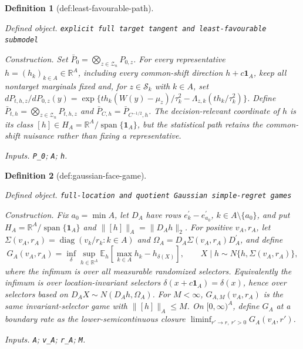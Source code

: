 \documentclass{article}
\newtheorem{definition}{Definition}
\begin{document}
\begin{definition}[def:least-favourable-path]\label{def:least-favourable-path}
\par\smallskip\noindent\emph{Defined object.} \texttt{explicit full target tangent and least-\allowbreak{}favourable submodel}
\par\smallskip\noindent\emph{Construction.} Set \(\bar P_0=\bigotimes_{z\in\mathcal Z_n}P_{0,z}\).  For every representative \(h=(h_k)_{k\in A}\in\mathbb R^A\), including every common-shift direction \(h+c\mathbf 1_A\), keep all nontarget marginals fixed and, for \(z\in\mathcal S_k\) with \(k\in A\), set \(dP_{t,h,z}/dP_{0,z}(y)=\exp\{t h_k(W(y)-\mu_z)/\tau_k^2-\Lambda_{z,k}(t h_k/\tau_k^2)\}\).  Define \(\bar P_{t,h}=\bigotimes_{z\in\mathcal Z_n}P_{t,h,z}\) and \(\bar P_{C,h}=\bar P_{C^{-1/2},h}\).  The decision-relevant coordinate of \(h\) is its class \([h]\in H_A=\mathbb R^A/\operatorname{span}\{\mathbf 1_A\}\), but the statistical path retains the common-shift nuisance rather than fixing a representative.
\par\smallskip\noindent\emph{Inputs.} \texttt{P\_\allowbreak{}0}; \texttt{A}; \texttt{h}.
\end{definition}

\begin{definition}[def:gaussian-face-game]\label{def:gaussian-face-game}
\par\smallskip\noindent\emph{Defined object.} \texttt{full-\allowbreak{}location and quotient Gaussian simple-\allowbreak{}regret games}
\par\smallskip\noindent\emph{Construction.} Fix \(a_0=\min A\), let \(D_A\) have rows \(e_k^{\prime}-e_{a_0}^{\prime}\), \(k\in A\setminus\{a_0\}\), and put \(H_A=\mathbb R^A/\operatorname{span}\{\mathbf 1_A\}\) and \(\lVert[h]\rVert_A=\lVert D_Ah\rVert_2\).  For positive \(v_A,r_A\), let \(\Sigma(v_A,r_A)=\operatorname{diag}(v_k/r_k:k\in A)\) and \(\Omega_A=D_A\Sigma(v_A,r_A)D_A^{\prime}\), and define
\[
G_A(v_A,r_A)=\inf_{\delta}\sup_{h\in\mathbb R^A}\mathbb E_h\!\left[\max_{k\in A}h_k-h_{\delta(X)}\right],\qquad X\mid h\sim N\{h,\Sigma(v_A,r_A)\},
\]
where the infimum is over all measurable randomized selectors.  Equivalently the infimum is over location-invariant selectors \(\delta(x+c\mathbf 1_A)=\delta(x)\), hence over selectors based on \(D_AX\sim N(D_Ah,\Omega_A)\).  For \(M<\infty\), \(G_{A,M}(v_A,r_A)\) is the same invariant-selector game with \(\lVert[h]\rVert_A\leq M\).  On \([0,\infty)^A\), define \(G_A\) at a boundary rate as the lower-semicontinuous closure \(\liminf_{r'\to r,\ r'>0}G_A(v_A,r')\).
\par\smallskip\noindent\emph{Inputs.} \texttt{A}; \texttt{v\_\allowbreak{}A}; \texttt{r\_\allowbreak{}A}; \texttt{M}.
\end{definition}
\end{document}
